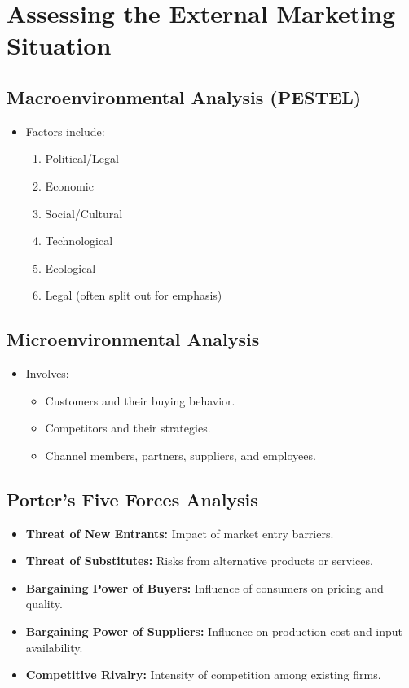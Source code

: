 \documentclass[12pt,a4paper]{report}
\begin{document}
\section{Assessing the External Marketing Situation}
\subsection{Macroenvironmental Analysis (PESTEL)}
\begin{itemize}
    \item Factors include:
    \begin{enumerate}[label=\alph*.]
         \item Political/Legal
         \item Economic
         \item Social/Cultural
         \item Technological
         \item Ecological
         \item Legal (often split out for emphasis)
    \end{enumerate}
\end{itemize}

\subsection{Microenvironmental Analysis}
\begin{itemize}
    \item Involves:
    \begin{itemize}
         \item Customers and their buying behavior.
         \item Competitors and their strategies.
         \item Channel members, partners, suppliers, and employees.
    \end{itemize}
\end{itemize}

\subsection{Porter’s Five Forces Analysis}
\begin{itemize}
    \item \textbf{Threat of New Entrants:} Impact of market entry barriers.
    \item \textbf{Threat of Substitutes:} Risks from alternative products or services.
    \item \textbf{Bargaining Power of Buyers:} Influence of consumers on pricing and quality.
    \item \textbf{Bargaining Power of Suppliers:} Influence on production cost and input availability.
    \item \textbf{Competitive Rivalry:} Intensity of competition among existing firms.
\end{itemize}
\end{document}
